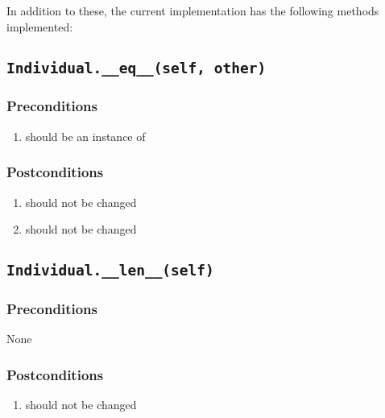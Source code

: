 \documentclass[letterpaper,10pt,english]{sphinxmanual}
\begin{document}
In addition to these, the current implementation has the following methods implemented:


\subsection{\texttt{Individual.\_\_eq\_\_(self, other)}}
\label{contracts:individual-eq-self-other}

\subsubsection{Preconditions}
\label{contracts:id3}\begin{enumerate}
\item {} 
 should be an instance of 

\end{enumerate}


\subsubsection{Postconditions}
\label{contracts:id4}\begin{enumerate}
\item {} 
 should not be changed

\item {} 
 should not be changed

\end{enumerate}


\subsection{\texttt{Individual.\_\_len\_\_(self)}}
\label{contracts:individual-len-self}

\subsubsection{Preconditions}
\label{contracts:id5}
None


\subsubsection{Postconditions}
\label{contracts:id6}\begin{enumerate}
\item {} 
 should not be changed

\end{enumerate}
\end{document}
